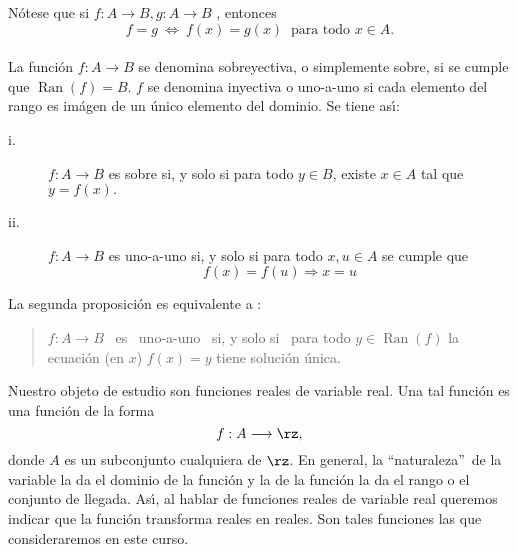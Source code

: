 

N\'{o}tese que si $f:A\longrightarrow B,g:A\longrightarrow B$ , entonces
\begin{equation}
f=g\ \Longleftrightarrow\ f(x)=g(x)\ \mbox{ \ para todo \ }x\in A.
\label{igualdadfunciones}%
\end{equation}


\paragraph{}

La funci\'{o}n $f:A\longrightarrow B$ se denomina
%
sobreyectiva, o simplemente sobre, si se cumple que $\operatorname*{Ran}%
(f)=B$. $f$ se
%
denomina inyectiva o uno-a-uno si cada elemento del rango es im\'{a}gen de un
\'{u}nico elemento del dominio. Se tiene as\'{\i}:

\begin{description}
\item[i.] $f:A\longrightarrow B$ es sobre si, y solo si para todo $y\in B$,
existe $x\in A$ tal que $y=f(x).$

\item[ii.] $f:A\longrightarrow B$ es uno-a-uno si, y solo si para todo $x,u\in
A$ se cumple que
\[
f(x)=f(u)\Longrightarrow x=u
\]

\end{description}

La segunda proposici\'{o}n es equivalente a :

\begin{quotation}
\noindent$f:A\longrightarrow B$ \ es \ uno-a-uno \ si, y solo si \ para todo
$y\in\operatorname*{Ran}(f)$ la ecuaci\'{o}n (en $x$) $f(x)=y$ tiene
soluci\'{o}n \'{u}nica.
\end{quotation}

Nuestro objeto de estudio son funciones%
reales de variable real. Una tal funci\'{o}n es una funci\'{o}n de la forma
\[
f:A\longrightarrow\rz,
\]
donde $A$ es un subconjunto cualquiera de $\rz$. En general, la
\textquotedblleft naturaleza\textquotedblright\ de la variable la da el
dominio de la funci\'{o}n y la de la funci\'{o}n la da el rango o el conjunto
de llegada. As\'{\i}, al hablar de funciones reales de variable real queremos
indicar que la funci\'{o}n transforma reales en reales. Son tales funciones
las que consideraremos en este curso.

